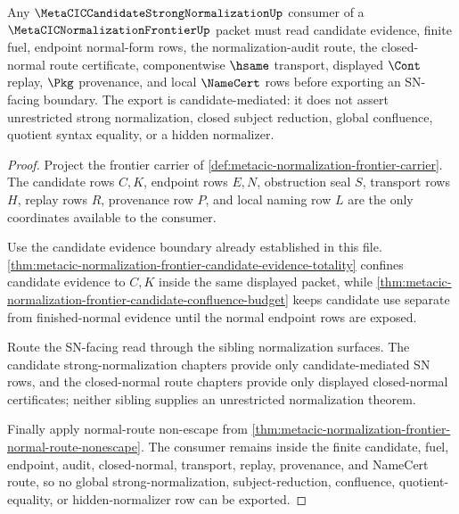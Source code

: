 \begin{theorem}
\label{thm:metacic-normalization-frontier-candidate-sn-consumer-route}
Any $\MetaCICCandidateStrongNormalizationUp$ consumer of a $\MetaCICNormalizationFrontierUp$ packet must read candidate evidence, finite fuel, endpoint normal-form rows, the normalization-audit route, the closed-normal route certificate, componentwise $\hsame$ transport, displayed $\Cont$ replay, $\Pkg$ provenance, and local $\NameCert$ rows before exporting an SN-facing boundary. The export is candidate-mediated: it does not assert unrestricted strong normalization, closed subject reduction, global confluence, quotient syntax equality, or a hidden normalizer.
\end{theorem}
\begin{proof}
Project the frontier carrier of \autoref{def:metacic-normalization-frontier-carrier}. The candidate rows $C,K$, endpoint rows $E,N$, obstruction seal $S$, transport rows $H$, replay rows $R$, provenance row $P$, and local naming row $L$ are the only coordinates available to the consumer.

Use the candidate evidence boundary already established in this file. \autoref{thm:metacic-normalization-frontier-candidate-evidence-totality} confines candidate evidence to $C,K$ inside the same displayed packet, while \autoref{thm:metacic-normalization-frontier-candidate-confluence-budget} keeps candidate use separate from finished-normal evidence until the normal endpoint rows are exposed.

Route the SN-facing read through the sibling normalization surfaces. The candidate strong-normalization chapters provide only candidate-mediated SN rows, and the closed-normal route chapters provide only displayed closed-normal certificates; neither sibling supplies an unrestricted normalization theorem.

Finally apply normal-route non-escape from \autoref{thm:metacic-normalization-frontier-normal-route-nonescape}. The consumer remains inside the finite candidate, fuel, endpoint, audit, closed-normal, transport, replay, provenance, and NameCert route, so no global strong-normalization, subject-reduction, confluence, quotient-equality, or hidden-normalizer row can be exported.
\end{proof}
